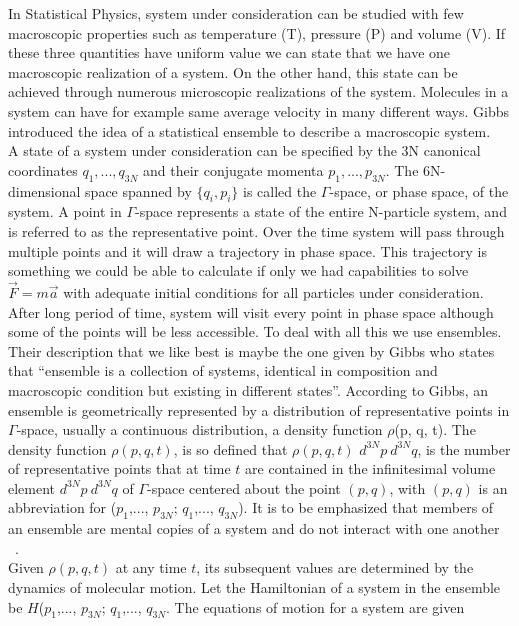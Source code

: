 \begin{sloppypar}
In Statistical Physics, system under consideration can be studied with few macroscopic properties such as temperature (T), pressure (P) and volume (V). If these three quantities have uniform value we can state that we have one macroscopic realization of a system. On the other hand, this state can be achieved through numerous microscopic realizations of the system. Molecules in a system can have for example same average velocity in many different ways. Gibbs introduced the idea of a statistical ensemble to describe a macroscopic system.\\
 A state of a system under consideration can be specified by the 3N canonical
coordinates $q_1,..., q_{3N}$ and their conjugate momenta $p_1,..., p_{3N}$. The 6N-dimensional space spanned by ${\{q_i, p_i} \}$ is called the $\Gamma$-space, or phase space, of the system. A point in $\Gamma$-space  represents a state of the entire N-particle system, and is referred to as the representative point. Over the time system will pass through multiple points and it will draw a trajectory in phase space. This trajectory is something we could be able to calculate if only we had capabilities to solve $\vec{F} =m\vec{a} $ with adequate initial conditions for all particles under consideration. After long period of time, system will visit every point in phase space although some of the points will be less accessible. To deal with all this we use ensembles. Their description that we like best is maybe the one given by Gibbs who states that ``ensemble is a collection of systems, identical in composition and macroscopic condition but existing in different states''. According to Gibbs, an ensemble is geometrically represented by a distribution of representative points in $\Gamma$-space, usually a continuous distribution, a density function $\rho$(p, q, t). The density function $\rho(p, q, t)$,  is so defined that $\rho(p, q, t)$ $d^{3N}p~d^{3N}q$, is the number of representative points that at time $t$ are contained in the infinitesimal volume element $d^{3N}p~d^{3N}q$ of $\Gamma$-space centered about the point $(p, q)$, with  $(p, q)$ is an abbreviation for ($p_1$,..., $p_{3N}$; $q_1$,..., $q_{3N}$). It is to be emphasized that members of an ensemble are mental copies of a system and do not interact with one another ~\citep{huang2009}.\\ 
Given $\rho (p, q, t)$ at any time $t$, its subsequent values are determined by the dynamics of molecular motion. Let the Hamiltonian of a system in the ensemble be ${H}$($p_1$,..., $p_{3N}$; $q_1$,..., $q_{3N}$. The equations of motion for a system are given

\end{sloppypar}
